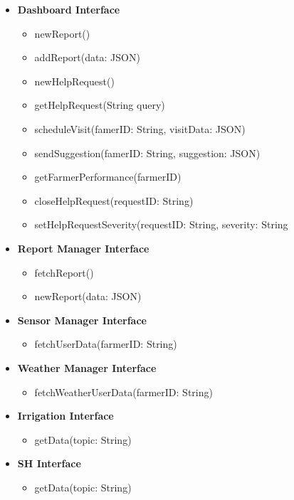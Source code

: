 \documentclass[10pt]{article} %
\begin{document}
\begin{itemize}
    \item \textbf{Dashboard Interface}   
    \begin{itemize}
        \item newReport()
        \item addReport(data: JSON)
        \item newHelpRequest()
        \item getHelpRequest(String query)
        \item scheduleVisit(famerID: String, visitData: JSON)
        \item sendSuggestion(famerID: String, suggestion: JSON)
        \item getFarmerPerformance(farmerID)
        \item closeHelpRequest(requestID: String)
        \item setHelpRequestSeverity(requestID: String, severity: String
    \end{itemize}

    \item \textbf{Report Manager Interface}
    \begin{itemize}
        \item fetchReport()
        \item newReport(data: JSON)
    \end{itemize}

    \item \textbf{Sensor Manager Interface}
    \begin{itemize}
        \item fetchUserData(farmerID: String)
    \end{itemize}

    \item \textbf{Weather Manager Interface}
    \begin{itemize}
        \item fetchWeatherUserData(farmerID: String)
    \end{itemize}

    \item \textbf{Irrigation Interface}
    \begin{itemize}
        \item getData(topic: String)
    \end{itemize}

    \item \textbf{SH Interface}
    \begin{itemize}
        \item getData(topic: String)
    \end{itemize}


\end{itemize}
\end{document}
